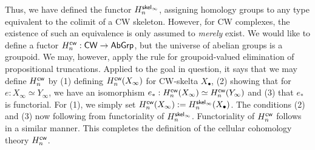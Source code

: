 \documentclass[a4page]{article}
\begin{document}
Thus, we have defined the functor $\textnormal{\ensuremath{H^{\mathsf{skel}_\infty}_{n}}}$, assigning homology groups to any type equivalent to the colimit of a CW skeleton. However, for CW complexes, the existence of such an equivalence is only assumed to \emph{merely} exist. We would like to define a fuctor $\textnormal{\ensuremath{H^{\mathsf{cw}}_{n}}} : \mathsf{CW} \to \textnormal{\ensuremath{\mathsf{AbGrp}}}$, but the universe of abelian groups is a groupoid. We may, however, apply the rule for groupoid-valued elimination of propositional truncations. Applied to the goal in question, it says that we may define $\textnormal{\ensuremath{H^{\mathsf{cw}}_{n}}}$ by (1) defining $\textnormal{\ensuremath{H^{\mathsf{cw}}_{n}}}(X_\infty)$ for CW-skelta $X_\bullet$, (2) showing that for $e : X_\infty \simeq Y_{\infty}$, we have an isomorphism $e_* : \textnormal{\ensuremath{H^{\mathsf{cw}}_{n}}}(X_\infty) \simeq \textnormal{\ensuremath{H^{\mathsf{cw}}_{n}}}(Y_\infty)$ and (3) that $e_*$ is functorial. For (1), we simply set $\textnormal{\ensuremath{H^{\mathsf{cw}}_{n}}}(X_\infty) := \textnormal{\ensuremath{H^{\mathsf{skel}_\infty}_{n}}}(X_\bullet)$. The conditions (2) and (3) now following from functoriality of $\textnormal{\ensuremath{H^{\mathsf{skel}_\infty}_{n}}}$. Functoriality of $\textnormal{\ensuremath{H^{\mathsf{cw}}_{n}}}$ follows in a similar manner. This completes the definition of the cellular cohomology theory $\textnormal{\ensuremath{H^{\mathsf{cw}}_{n}}}$.


\printbibliography
\end{document}
